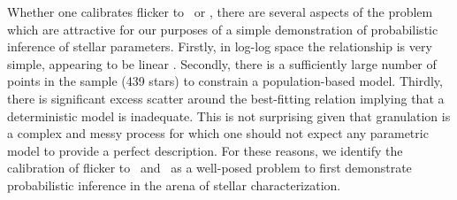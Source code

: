 Whether one calibrates flicker to \logg\ or \rhostar, there are several aspects
of the problem which are attractive for our purposes of a simple demonstration
of probabilistic inference of stellar parameters. Firstly, in log-log space the
relationship is very simple, appearing to be linear \citep{kipping:2014}.
Secondly, there is a sufficiently large number of points in the sample (439
stars) to constrain a population-based model. Thirdly, there is significant
excess scatter around the best-fitting relation implying that a deterministic
model is inadequate. This is not surprising given that granulation is a complex
and messy process for which one should not expect any parametric model to
provide a perfect description. For these reasons, we identify the calibration of
flicker to \logg\ and \rhostar\ as a well-posed problem to first demonstrate
probabilistic inference in the arena of stellar characterization.
